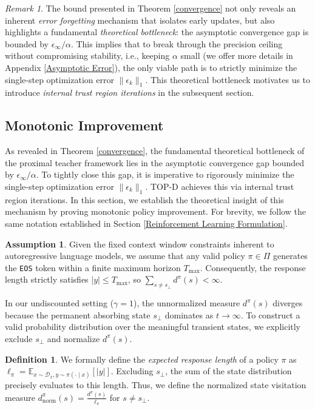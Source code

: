 \documentclass{article}
\theoremstyle{plain}
\theoremstyle{definition}
\newtheorem{definition}[theorem]{Definition}
\newtheorem{assumption}[theorem]{Assumption}
\theoremstyle{remark}
\newtheorem{remark}[theorem]{Remark}
\begin{document}
\begin{remark}
	The bound presented in Theorem \ref{convergence} not only reveals an inherent \textit{error forgetting} mechanism that isolates early updates, but also highlights a fundamental \textit{theoretical bottleneck}: the asymptotic convergence gap is bounded by $\epsilon_\infty/\alpha$. This implies that to break through the precision ceiling without compromising stability, i.e., keeping $\alpha$ small (we offer more details in Appendix \ref{Asymptotic Error}), the only viable path is to strictly minimize the single-step optimization error $\lVert\epsilon_k\rVert_1$. This theoretical bottleneck motivates us to introduce \textit{internal trust region iterations} in the subsequent section.
\end{remark}


\subsection{Monotonic Improvement}\label{Monotonic Improvement}
As revealed in Theorem \ref{convergence}, the fundamental theoretical bottleneck of the proximal teacher framework lies in the asymptotic convergence gap bounded by $\epsilon_\infty/\alpha$. To tightly close this gap, it is imperative to rigorously minimize the single-step optimization error $\lVert\epsilon_k\rVert_1$. TOP-D achieves this via internal trust region iterations. In this section, we establish the theoretical insight of this mechanism by proving monotonic policy improvement. For brevity, we follow the same notation established in Section \ref{Reinforcement Learning Formulation}.
\begin{assumption}\label{assumption 2}
	Given the fixed context window constraints inherent to autoregressive language models, we assume that any valid policy $\pi \in \Pi$ generates the \texttt{EOS} token within a finite maximum horizon $T_{\max}$. Consequently, the response length strictly satisfies $\lvert y\rvert \leq T_{\max}$, so $\sum_{s\neq s_\bot}d^{\pi}(s)<\infty$.
\end{assumption}
In our undiscounted setting ($\gamma=1$), the unnormalized measure $d^\pi(s)$ diverges because the permanent absorbing state $s_\bot$ dominates as $t \to \infty$. To construct a valid probability distribution over the meaningful transient states, we explicitly exclude $s_\bot$ and normalize $d^\pi(s)$.
\begin{definition}\label{normalized state distribution}
	We formally define the \textit{expected response length} of a policy $\pi$ as $\ell_\pi = \mathbb{E}_{x \sim \mathcal{D}_x, y \sim \pi(\cdot \mid x)}\left[\lvert y\rvert\right]$. Excluding $s_\bot$, the sum of the state distribution precisely evaluates to this length. Thus, we define the normalized state visitation measure $d^\pi_{\mathrm{norm}}(s) = \frac{d^\pi(s)}{\ell_\pi}$ for $s \neq s_\bot$.
\end{definition}
\end{document}
